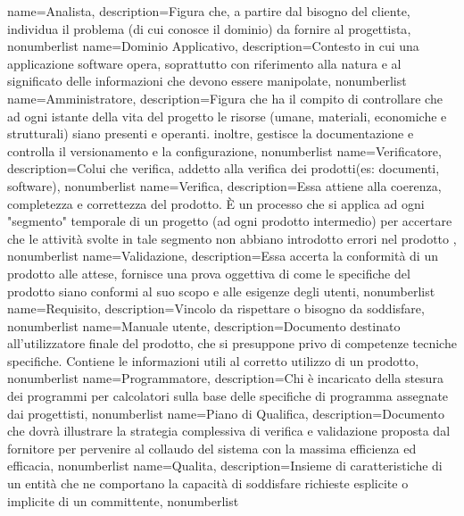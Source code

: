 {
	name={Analista},
	description={Figura che, a partire dal bisogno del cliente, individua il problema (di cui conosce il dominio) da fornire al progettista},
	nonumberlist 
}
{
	name={Dominio Applicativo},
	description={Contesto in cui una applicazione software opera, soprattutto con riferimento alla natura e al significato delle informazioni che devono essere manipolate},
	nonumberlist 
}
{
	name={Amministratore},
	description={Figura che ha il compito di controllare che ad ogni istante della vita del progetto le risorse (umane, materiali, economiche e strutturali) siano presenti e operanti. inoltre, gestisce la documentazione e controlla il versionamento e la configurazione},
	nonumberlist 
}
{
	name={Verificatore},
	description={Colui che verifica, addetto alla verifica dei prodotti(es: documenti, software)},
	nonumberlist 
}
{
	name={Verifica},
	description={Essa attiene alla coerenza, completezza e correttezza del prodotto. È un processo che si applica ad ogni "segmento" temporale di un progetto (ad ogni prodotto intermedio) per accertare che le attività svolte in tale segmento non abbiano introdotto errori nel prodotto
	},
	nonumberlist 
}
{
	name={Validazione},
	description={Essa accerta la conformità di un prodotto alle attese, fornisce una prova oggettiva di come le specifiche del prodotto siano conformi al suo scopo e alle esigenze degli utenti},
	nonumberlist 
}
{
	name={Requisito},
	description={Vincolo da rispettare o bisogno da soddisfare},
	nonumberlist 
}
{
	name={Manuale utente},
	description={Documento destinato all'utilizzatore finale del prodotto, che si presuppone privo di competenze tecniche specifiche. Contiene le informazioni utili al corretto utilizzo di un prodotto},
	nonumberlist 
}
{
	name={Programmatore},
	description={Chi è incaricato della stesura dei programmi per calcolatori sulla base delle specifiche di programma assegnate dai progettisti},
	nonumberlist 
}
{
	name={Piano di Qualifica},
	description={Documento che dovrà illustrare la strategia complessiva di verifica e validazione proposta dal fornitore per pervenire al collaudo del sistema con la massima efficienza ed efficacia},
	nonumberlist 
}
{
	name={Qualita},
	description={Insieme di caratteristiche di un entità che ne comportano la capacità di soddisfare richieste esplicite o implicite di un committente},
	nonumberlist 
}

